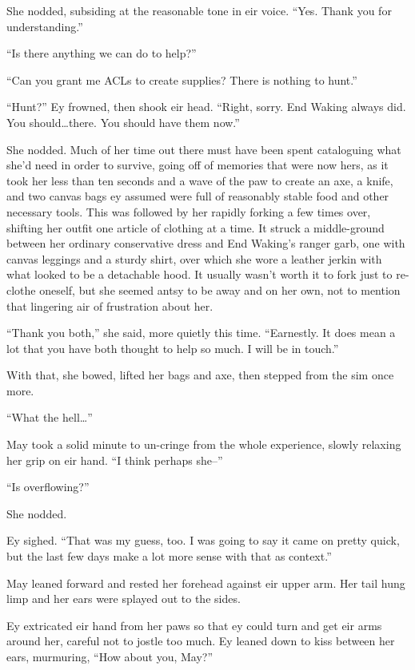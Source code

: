She nodded, subsiding at the reasonable tone in eir voice. ``Yes. Thank you for understanding.''

``Is there anything we can do to help?''

``Can you grant me ACLs to create supplies? There is nothing to hunt.''

``Hunt?'' Ey frowned, then shook eir head. ``Right, sorry. End Waking always did. You should\ldots there. You should have them now.''

She nodded. Much of her time out there must have been spent cataloguing what she'd need in order to survive, going off of memories that were now hers, as it took her less than ten seconds and a wave of the paw to create an axe, a knife, and two canvas bags ey assumed were full of reasonably stable food and other necessary tools. This was followed by her rapidly forking a few times over, shifting her outfit one article of clothing at a time. It struck a middle-ground between her ordinary conservative dress and End Waking's ranger garb, one with canvas leggings and a sturdy shirt, over which she wore a leather jerkin with what looked to be a detachable hood. It usually wasn't worth it to fork just to re-clothe oneself, but she seemed antsy to be away and on her own, not to mention that lingering air of frustration about her.

``Thank you both,'' she said, more quietly this time. ``Earnestly. It does mean a lot that you have both thought to help so much. I will be in touch.''

With that, she bowed, lifted her bags and axe, then stepped from the sim once more.

``What the hell\ldots{}''

May took a solid minute to un-cringe from the whole experience, slowly relaxing her grip on eir hand. ``I think perhaps she--''

``Is overflowing?''

She nodded.

Ey sighed. ``That was my guess, too. I was going to say it came on pretty quick, but the last few days make a lot more sense with that as context.''

May leaned forward and rested her forehead against eir upper arm. Her tail hung limp and her ears were splayed out to the sides.

Ey extricated eir hand from her paws so that ey could turn and get eir arms around her, careful not to jostle too much. Ey leaned down to kiss between her ears, murmuring, ``How about you, May?''

